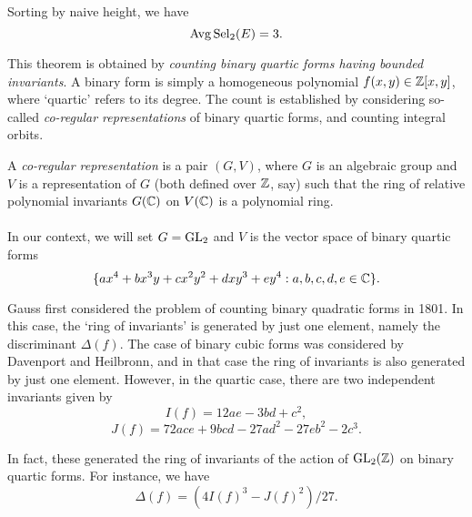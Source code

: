 \documentclass[12pt,amsfont]{amsart}
\begin{document}
\begin{theorem} Sorting by naive height, we have
\[\operatorname{Avg} \operatorname{Sel}_2(E) = 3. \]
\end{theorem}

This theorem is obtained by \emph{counting binary quartic forms having bounded invariants}. A binary form is simply a homogeneous polynomial $f(x,y) \in {\mathbb Z}[x,y]$, where `quartic' refers to its degree. The count is established by considering so-called \emph{co-regular representations} of binary quartic forms, and counting integral orbits. 

\begin{definition} A \emph{co-regular representation} is a pair $(G,V)$, where $G$ is an algebraic group and $V$ is a representation of $G$ (both defined over ${\mathbb Z}$, say) such that the ring of relative polynomial invariants $G({\mathbb C})$ on $V({\mathbb C})$ is a polynomial ring. \\ \\
In our context, we will set $G = \operatorname{GL}_2$ and $V$ is the vector space of binary quartic forms
\[\{ax^4 + bx^3 y + cx^2 y^2 + dxy^3 + ey^4 : a,b,c,d,e \in {\mathbb C}\}.\]
\end{definition}

Gauss first considered the problem of counting binary quadratic forms in 1801. In this case, the `ring of invariants' is generated by just one element, namely the discriminant $\Delta(f)$. The case of binary cubic forms was considered by Davenport and Heilbronn, and in that case the ring of invariants is also generated by just one element. However, in the quartic case, there are two independent invariants given by
\[I(f) = 12ae - 3bd + c^2,\]
\[J(f) = 72ace + 9bcd -27ad^2 - 27eb^2 - 2c^3.\]

In fact, these generated the ring of invariants of the action of $\operatorname{GL}_2({\mathbb Z})$ on binary quartic forms. For instance, we have
\[\Delta(f) = (4I(f)^3 - J(f)^2)/27.\]
\end{document}
